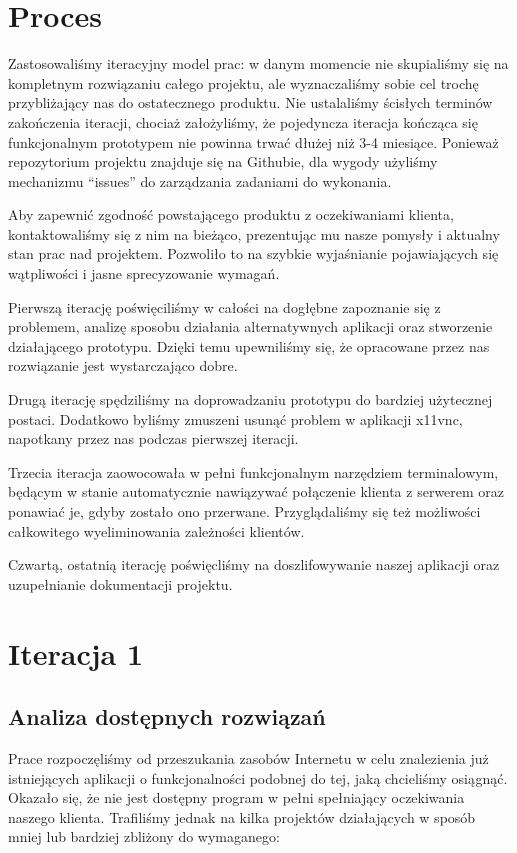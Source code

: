 \section{Proces}

Zastosowaliśmy iteracyjny model prac: w danym momencie nie skupialiśmy się na kompletnym rozwiązaniu całego projektu, ale wyznaczaliśmy sobie cel trochę przybliżający nas do ostatecznego produktu. Nie ustalaliśmy ścisłych terminów zakończenia iteracji, chociaż założyliśmy, że pojedyncza iteracja kończąca się funkcjonalnym prototypem nie powinna trwać dłużej niż 3-4 miesiące. Ponieważ repozytorium projektu znajduje się na Githubie, dla wygody użyliśmy mechanizmu ``issues'' do zarządzania zadaniami do wykonania.

Aby zapewnić zgodność powstającego produktu z oczekiwaniami klienta, kontaktowaliśmy się z nim na bieżąco, prezentując mu nasze pomysły i aktualny stan prac nad projektem. Pozwoliło to na szybkie wyjaśnianie pojawiających się wątpliwości i jasne sprecyzowanie wymagań.

Pierwszą iterację poświęciliśmy w całości na dogłębne zapoznanie się z problemem, analizę sposobu działania alternatywnych aplikacji oraz stworzenie działającego prototypu. Dzięki temu upewniliśmy się, że opracowane przez nas rozwiązanie jest wystarczająco dobre.

Drugą iterację spędziliśmy na doprowadzaniu prototypu do bardziej użytecznej postaci. Dodatkowo byliśmy zmuszeni usunąć problem w aplikacji x11vnc, napotkany przez nas podczas pierwszej iteracji.

Trzecia iteracja zaowocowała w pełni funkcjonalnym narzędziem terminalowym, będącym w stanie automatycznie nawiązywać połączenie klienta z serwerem oraz ponawiać je, gdyby zostało ono przerwane. Przyglądaliśmy się też możliwości całkowitego wyeliminowania zależności klientów.

Czwartą, ostatnią iterację poświęcliśmy na doszlifowywanie naszej aplikacji oraz uzupełnianie dokumentacji projektu.

\section{Iteracja 1}
  \subsection{Analiza dostępnych rozwiązań}
    Prace rozpoczęliśmy od przeszukania zasobów Internetu w celu znalezienia już istniejących aplikacji o funkcjonalności podobnej do tej, jaką chcieliśmy osiągnąć. Okazało się, że nie jest dostępny program w pełni spełniający oczekiwania naszego klienta. Trafiliśmy jednak na kilka projektów działających w sposób mniej lub bardziej zbliżony do wymaganego:

